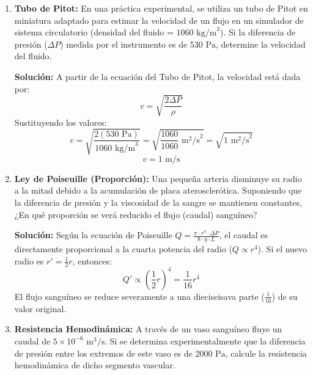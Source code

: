 \documentclass[12pt,letterpaper]{article}
\begin{document}
\begin{enumerate}
    \textbf{Solución:}
    Siendo el tubo horizontal ($h_1 = h_2$), la Ecuación de Bernoulli se reduce a:
    \[
    P_1 + \frac{1}{2}\rho v_1^2 = P_2 + \frac{1}{2}\rho v_2^2
    \]
    Despejando $P_2$:
    \[
    P_2 = P_1 + \frac{1}{2}\rho (v_1^2 - v_2^2)
    \]
    \[
    P_2 = 15000 \text{ Pa} + 500 \text{ kg/m}^3 ((2 \text{ m/s})^2 - (4 \text{ m/s})^2)
    \]
    \[
    P_2 = 15000 \text{ Pa} + 500 (4 - 16) \text{ Pa} = 15000 \text{ Pa} - 6000 \text{ Pa} = 9000 \text{ Pa}
    \]

    \vspace{0.3cm}
    \item \textbf{Tubo de Pitot:} En una práctica experimental, se utiliza un tubo de Pitot en miniatura adaptado para estimar la velocidad de un flujo en un simulador de sistema circulatorio (densidad del fluido = $1060 \text{ kg/m}^3$). Si la diferencia de presión ($\Delta P$) medida por el instrumento es de $530 \text{ Pa}$, determine la velocidad del fluido.

    \textbf{Solución:}
    A partir de la ecuación del Tubo de Pitot, la velocidad está dada por:
    \[
    v = \sqrt{\frac{2 \Delta P}{\rho}}
    \]
    Sustituyendo los valores:
    \[
    v = \sqrt{\frac{2(530 \text{ Pa})}{1060 \text{ kg/m}^3}} = \sqrt{\frac{1060}{1060} \text{ m}^2\text{/s}^2} = \sqrt{1 \text{ m}^2\text{/s}^2}
    \]
    \[
    v = 1 \text{ m/s}
    \]

    \vspace{0.3cm}
    \item \textbf{Ley de Poiseuille (Proporción):} Una pequeña arteria disminuye su radio a la mitad debido a la acumulación de placa aterosclerótica. Suponiendo que la diferencia de presión y la viscosidad de la sangre se mantienen constantes, ¿En qué proporción se verá reducido el flujo (caudal) sanguíneo?

    \textbf{Solución:}
    Según la ecuación de Poiseuille $Q = \frac{\pi \cdot r^4 \cdot \Delta P}{8 \cdot \eta \cdot L}$, el caudal es directamente proporcional a la cuarta potencia del radio ($Q \propto r^4$).
    Si el nuevo radio es $r' = \frac{1}{2}r$, entonces:
    \[
    Q' \propto \left(\frac{1}{2}r\right)^4 = \frac{1}{16} r^4
    \]
    El flujo sanguíneo se reduce severamente a una dieciseisava parte ($\frac{1}{16}$) de su valor original.

    \vspace{0.3cm}
    \item \textbf{Resistencia Hemodinámica:} A través de un vaso sanguíneo fluye un caudal de $5 \times 10^{-6} \text{ m}^3\text{/s}$. Si se determina experimentalmente que la diferencia de presión entre los extremos de este vaso es de $2000 \text{ Pa}$, calcule la resistencia hemodinámica de dicho segmento vascular.


\end{enumerate}
\end{document}
